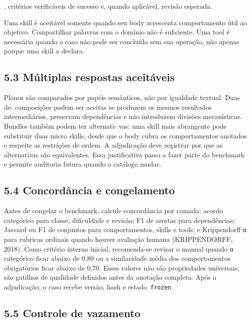 \documentclass[12pt,a4paper]{article}
\begin{document}

. critérios verificáveis de sucesso e, quando aplicável, revisão esperada.\par

Uma skill é aceitável somente quando seu body acrescenta comportamento útil ao objetivo. Compartilhar palavras com o domínio não é suficiente. Uma tool é necessária quando o caso não pode ser concluído sem sua operação, não apenas porque uma skill a declara.


\subsection*{5.3 Múltiplas respostas aceitáveis}

Planos são comparados por papéis semânticos, não por igualdade textual. Duas de- composições podem ser aceitas se produzem os mesmos resultados intermediários, preservam dependências e não introduzem divisões mecanísticas. Bundles também podem ter alternati- vas: uma skill mais abrangente pode substituir duas micro skills, desde que o body cubra os comportamentos anotados e respeite as restrições de ordem. A adjudicação deve registrar por que as alternativas são equivalentes. Essa justificativa passa a fazer parte do benchmark e permite auditoria futura quando o catálogo mudar.


\subsection*{5.4 Concordância e congelamento}

Antes de congelar o benchmark, calcule concordância por camada: acordo categórico para classe, dificuldade e revisão; F1 de arestas para dependências; Jaccard ou F1 de conjuntos para comportamentos, skills e tools; e Krippendorff α para rubricas ordinais quando houver avaliação humana (KRIPPENDORFF, 2018). Como critério interno inicial, recomenda-se revisar o manual quando α categórico ficar abaixo de 0,80 ou a similaridade média dos comportamentos obrigatórios ficar abaixo de 0,70. Esses valores não são propriedades universais; são gatilhos de qualidade definidos antes da anotação completa. Após a adjudicação, o caso recebe versão, hash e estado\texttt{ frozen}.


\subsection*{5.5 Controle de vazamento}
\end{document}
